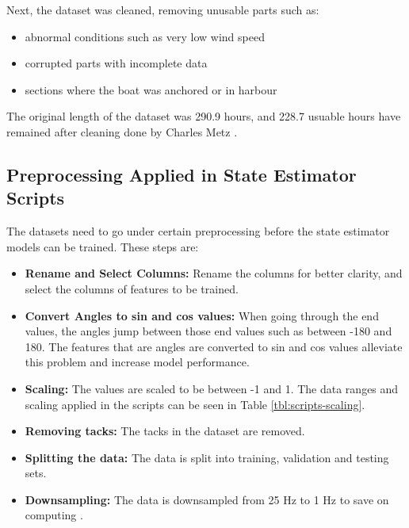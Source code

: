 \documentclass[12pt,twoside]{report}
\begin{document}
Next, the dataset was cleaned, removing unusable parts such as:
\begin{itemize}
    \item abnormal conditions such as very low wind speed
    \item corrupted parts with incomplete data
    \item sections where the boat was anchored or in harbour
\end{itemize}

The original length of the dataset was 290.9 hours, and 228.7 usuable hours have remained after cleaning done by Charles Metz \cite{charles}.

\subsection{Preprocessing Applied in State Estimator Scripts}
The datasets need to go under certain preprocessing before the state estimator models can be trained. These steps are:

\begin{itemize}
    \item \textbf{Rename and Select Columns:} Rename the columns for better clarity, and select the columns of features to be trained.
    \item \textbf{Convert Angles to sin and cos values:} When going through the end values, the angles jump between those end values such as between -180 and 180. The features that are angles are converted to sin and cos values alleviate this problem and increase model performance.
    \item \textbf{Scaling:} The values are scaled to be between -1 and 1. The data ranges and scaling applied in the scripts can be seen in Table \ref{tbl:scripts-scaling}.
    \item \textbf{Removing tacks:} The tacks in the dataset are removed.
    \item \textbf{Splitting the data:} The data is split into training, validation and testing sets.
    \item \textbf{Downsampling:} The data is downsampled from 25 Hz to 1 Hz to save on computing .
\end{itemize}
\end{document}
